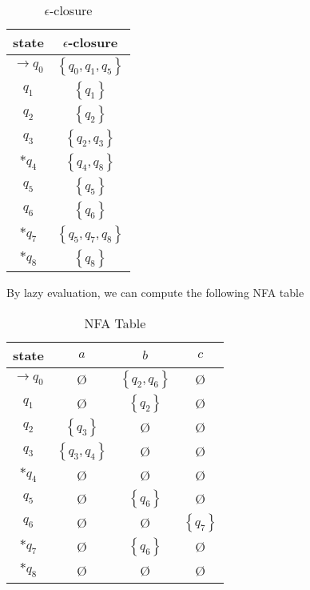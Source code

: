 \documentclass[12pt]{article}
\begin{document}
\begin{table}[H]
  \centering

  \begin{tabular}{c|c}
    state             & $\epsilon$-closure           \\ \hline
    $\rightarrow q_0$ & $\left\{q_0,q_1,q_5\right\}$ \\
    $q_1$             & $\left\{q_1\right\}$         \\
    $q_2$             & $\left\{q_2\right\}$         \\
    $q_3$             & $\left\{q_2,q_3\right\}$     \\
    $* q_4$           & $\left\{q_4,q_8\right\}$     \\
    $q_5$             & $\left\{q_5\right\}$         \\
    $q_6$             & $\left\{q_6\right\}$         \\
    $* q_7$           & $\left\{q_5,q_7,q_8\right\}$ \\
    $* q_8$           & $\left\{q_8\right\}$
  \end{tabular}

  \caption{$\epsilon$-closure}
\end{table}

By lazy evaluation, we can compute the following NFA table

\begin{table}[H]
  \centering

  \begin{tabular}{c|ccc}
    state             & $a$                      & $b$                      & $c$                  \\ \hline
    $\rightarrow q_0$ & \O                       & $\left\{q_2,q_6\right\}$ & \O                   \\
    $q_1$             & \O                       & $\left\{q_2\right\}$     & \O                   \\
    $q_2$             & $\left\{q_3\right\}$     & \O                       & \O                   \\
    $q_3$             & $\left\{q_3,q_4\right\}$ & \O                       & \O                   \\
    $* q_4$           & \O                       & \O                       & \O                   \\
    $q_5$             & \O                       & $\left\{q_6\right\}$     & \O                   \\
    $q_6$             & \O                       & \O                       & $\left\{q_7\right\}$ \\
    $* q_7$           & \O                       & $\left\{q_6\right\}$     & \O                   \\
    $* q_8$           & \O                       & \O                       & \O
  \end{tabular}

  \caption{NFA Table}
\end{table}
\end{document}
